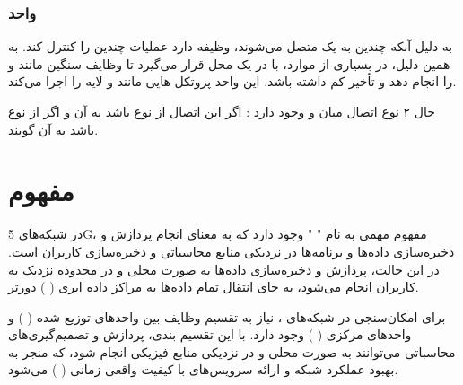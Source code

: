 \documentclass[landscape, 12pt]{report}
\begin{document}
\subsubsection*{واحد 
	}
به دلیل آنکه چندین
  به یک
    متصل می‌شوند،
      وظیفه دارد عملیات چندین
        را کنترل ‌کند. به همین دلیل، در بسیاری از موارد،
          با
            در یک محل قرار می‌گیرد تا وظایف سنگین مانند
              و
                را انجام دهد و تأخیر کم داشته باشد. این واحد پروتکل هایی مانند
                  و لایه
                    را اجرا می‌کند.
                    
حال ۲ نوع اتصال میان
  و
    وجود دارد :
اگر این اتصال از نوع
  باشد به آن
    و اگر از نوع
      باشد به آن
        گویند.
        
 \section*{مفهوم 
 	}
در شبکه‌های 5G، مفهوم مهمی به نام "
" وجود دارد که به معنای انجام پردازش و ذخیره‌سازی داده‌ها و برنامه‌ها در نزدیکی منابع محاسباتی و ذخیره‌سازی کاربران است. در این حالت، پردازش و ذخیره‌سازی داده‌ها به صورت محلی و در محدوده نزدیک به کاربران انجام می‌شود، به جای انتقال تمام داده‌ها به مراکز داده ابری ( 
) دورتر.

برای امکان‌سنجی
  در شبکه‌های
   ، نیاز به تقسیم وظایف بین واحدهای توزیع شده (
   ) و واحدهای مرکزی (
	 ) وجود دارد. با این تقسیم بندی، پردازش و تصمیم‌گیری‌های محاسباتی می‌توانند به صورت محلی و در نزدیکی منابع فیزیکی انجام شود، که منجر به بهبود عملکرد شبکه و ارائه سرویس‌های با کیفیت واقعی زمانی (
	 ) می‌شود.
	 
\end{document}
